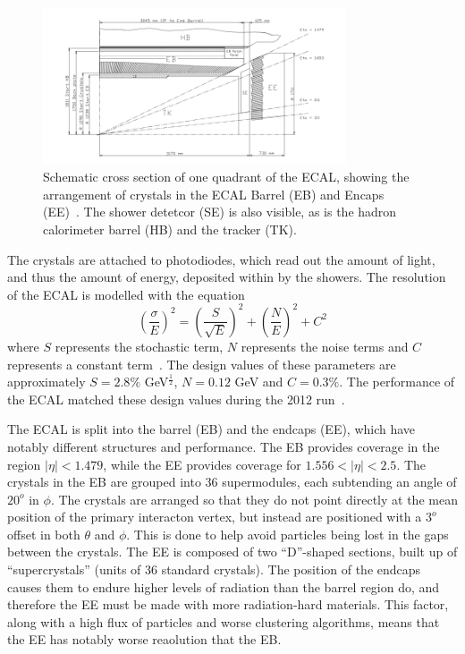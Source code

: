 \documentclass[10pt]{article}
\begin{document}
\begin{figure}[h]
  \centering
  \includegraphics[width=0.8\textwidth]{"EcalEBEE"}
  \caption{Schematic cross section of one quadrant of the ECAL, showing the arrangement of crystals in the ECAL Barrel (EB) and Encaps (EE)~\cite{cmsEcal}. The shower detetcor (SE) is also visible, as is the hadron calorimeter barrel (HB) and the tracker (TK).}
  \label{ecal}
\end{figure}


The crystals are attached to photodiodes, which read out the amount of light, and thus the amount of energy, deposited within by the showers. The resolution of the ECAL is modelled with the equation \begin{equation} \left( \frac{\sigma}{E}\right) ^2= \left( \frac{S}{\sqrt{E}} \right)^2 + \left( \frac{N}{E} \right)^2 + C^2\end{equation} where $S$ represents the stochastic term, $N$ represents the noise terms and $C$ represents a constant term~\cite{CMSDesign}. The design values of these parameters are approximately $S=2.8\%$ GeV$^\frac{1}{2}$, $ N= 0.12$ GeV and $C=0.3 \%$. The performance of the ECAL matched these design values during the 2012 run~\cite{ECAL2012}. 


The ECAL is split into the barrel (EB) and the endcaps (EE), which have notably different structures and performance. The EB provides coverage in the region $|\eta| < 1.479$, while the EE provides coverage for $1.556 < |\eta| < 2.5$. The crystals in the EB are grouped into 36 supermodules, each subtending an angle of $20^o$ in $\phi$. The crystals are arranged so that they do not point directly at the mean position of the primary interacton vertex, but instead are positioned with a $3^o$ offset in both $\theta$ and $\phi$. This is done to help avoid particles being lost in the gaps between the crystals. The EE is composed of two ``D''-shaped sections, built up of ``supercrystals'' (units of 36 standard crystals). The position of the endcaps causes them to endure higher levels of radiation than the barrel region do, and therefore the EE must be made with more radiation-hard materials. This factor, along with a high flux of particles and worse clustering algorithms, means that the EE has notably worse reaolution that the EB. 
\end{document}
